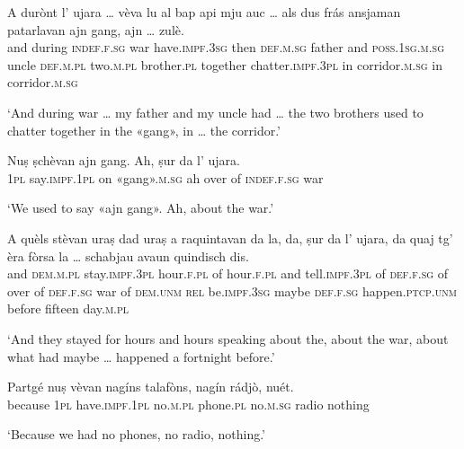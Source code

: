 \begin{linenumbers}
\gll    A durònt l’ ujara … vèva lu al bap api mju auc … als dus frás ansjaman patarlavan ajn gang, ajn … zulè.\footnotemark \\
and during \textsc{indef.f.sg} war {} have.\textsc{impf.3sg} then \textsc{def.m.sg} father and \textsc{poss.1sg.m.sg} uncle {} \textsc{def.m.pl} two.\textsc{m.pl} brother.\textsc{pl} together chatter.\textsc{impf.3pl} in corridor.\textsc{m.sg} in {} corridor.\textsc{m.sg} \\
\end{linenumbers}
\medskip
\glt `And during war … my father and my uncle had … the two brothers used to chatter together in the «gang», in … the corridor.' 
\medskip

\begin{linenumbers}
\gll    Nuṣ ṣchèvan ajn gang. Ah, ṣur da l’ ujara.\\
 \textsc{1pl} say.\textsc{impf.1pl} on «gang».\textsc{m.sg} ah over of \textsc{indef.f.sg} war \\
\end{linenumbers}
\medskip
\glt `We used to say «ajn gang». Ah, about the war.'
\medskip

\begin{linenumbers}
\gll    A quèls stèvan uraṣ dad uraṣ a raquintavan da la, da, ṣur da l’ ujara, da quaj tg’ èra fòrsa la … schabjau avaun quindisch dis.\\
and \textsc{dem.m.pl} stay.\textsc{impf.3pl} hour.\textsc{f.pl} of hour.\textsc{f.pl} and tell.\textsc{impf.3pl} of \textsc{def.f.sg} of over of \textsc{def.f.sg} war of \textsc{dem.unm} \textsc{rel} be.\textsc{impf.3sg} maybe \textsc{def.f.sg} {} happen.\textsc{ptcp.unm} before fifteen day.\textsc{m.pl}\\
\end{linenumbers}
\medskip
\glt `And they stayed for hours and hours speaking about the, about the war, about what had maybe … happened a fortnight before.'
\medskip

\begin{linenumbers}
\gll    Partgé nuṣ vèvan nagíns talafòns, nagín rádjò, nuét.\\
because \textsc{1pl} have.\textsc{impf.1pl} no.\textsc{m.pl} phone.\textsc{pl} no.\textsc{m.sg} radio nothing\\
\end{linenumbers}
\medskip
\glt `Because we had no phones, no radio, nothing.'
\medskip

